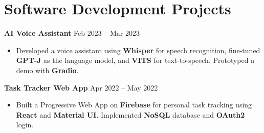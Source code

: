 \documentclass[letterpaper,12pt]{article}
\newenvironment{zitemize}{
\begin{itemize} \vspace{-.9em}\itemsep 0pt \parskip 0pt}
{\end{itemize}\vspace{-.5em}}
\newcommand{\proglang}[1]{\textbf{#1}}
\begin{document}
\section{Software Development Projects}

\textbf{AI Voice Assistant} \hfill Feb 2023 -- Mar 2023 \\
\begin{zitemize}
    \item Developed a voice assistant using \proglang{Whisper} for speech recognition, fine-tuned \proglang{GPT-J} as 
    the language model, and \proglang{VITS} for text-to-speech. Prototyped a demo with \proglang{Gradio}.
\end{zitemize}

\textbf{Task Tracker Web App} \hfill Apr 2022 -- May 2022 \\
\begin{zitemize}
    \item Built a Progressive Web App on \proglang{Firebase} for personal task tracking using \proglang{React} and 
    \proglang{Material UI}. Implemented \proglang{NoSQL} database and \proglang{OAuth2} login.
\end{zitemize}
\end{document}
